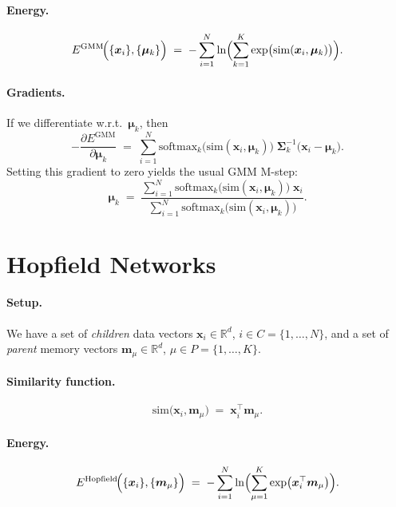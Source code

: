 \documentclass{article}
\begin{document}
\paragraph{Energy.}
\begin{equation}
E^{\mathrm{GMM}}\!\Bigl(\{\bm{x}_i\}, \{\bm{\mu}_k\}\Bigr)
\;=\;
-\sum_{i=1}^N
\ln \Bigl(\sum_{k=1}^K
\exp\bigl(\mathrm{sim}(\bm{x}_i,\bm{\mu}_k)\bigr)\Bigr).
\end{equation}

\paragraph{Gradients.}
If we differentiate w.r.t.\ \(\bm{\mu}_k\), then
\[
-\frac{\partial E^{\mathrm{GMM}}}{\partial \bm{\mu}_k}
\;=\;
\sum_{i=1}^N 
\text{softmax}_k\!\bigl(\mathrm{sim}(\bm{x}_i,\bm{\mu}_k)\bigr)
\;\bm{\Sigma}_k^{-1}\bigl(\bm{x}_i - \bm{\mu}_k\bigr).
\]
Setting this gradient to zero yields the usual GMM M-step:
\[
\bm{\mu}_k
\;=\;
\frac{\sum_{i=1}^N 
\text{softmax}_k\!\bigl(\mathrm{sim}(\bm{x}_i,\bm{\mu}_k)\bigr)\;\bm{x}_i}
     {\sum_{i=1}^N
     \text{softmax}_k\!\bigl(\mathrm{sim}(\bm{x}_i,\bm{\mu}_k)\bigr)}.
\]

\section{Hopfield Networks}

\paragraph{Setup.}
We have a set of \emph{children} data vectors \(\bm{x}_i \in \mathbb{R}^d\), \(i\in C=\{1,\ldots,N\}\), and a set of \emph{parent} memory vectors \(\bm{m}_\mu \in \mathbb{R}^d\), \(\mu\in P=\{1,\ldots,K\}\).

\paragraph{Similarity function.}
\[
\mathrm{sim}\bigl(\bm{x}_i, \bm{m}_\mu\bigr)
\;=\;
\bm{x}_i^\top \bm{m}_\mu.
\]

\paragraph{Energy.}
\begin{equation}
E^{\mathrm{Hopfield}}\!\Bigl(\{\bm{x}_i\}, \{\bm{m}_\mu\}\Bigr)
\;=\;
-\sum_{i=1}^N
\ln \Bigl(\sum_{\mu=1}^K
\exp \bigl(\bm{x}_i^\top \bm{m}_\mu\bigr)\Bigr).
\end{equation}
\end{document}
